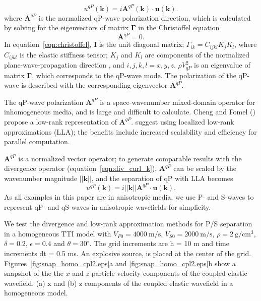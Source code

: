 \documentclass[manuscript,ulem,graphix,revised]{geophysics}
\begin{document}
\begin{equation}
u^{qP}(\boldsymbol{k})=i \boldsymbol{A}^{qP}(\boldsymbol{k}) \cdot \boldsymbol{u}(\boldsymbol{k}).
\label{eqn:div_curl_ak}
\end{equation}
where $\boldsymbol{A}^{qP}$ is the normalized qP-wave polarization direction, which is calculated by solving for the eigenvectors of matrix $\boldsymbol{\Gamma}$ in the Christoffel equation
\begin{equation}
[\boldsymbol{\Gamma}-\rho V_{qP}^2\boldsymbol{I}]\boldsymbol{A}^{qP}=0.
\label{eqn:christoffel}
\end{equation}
In equation~\ref{eqn:christoffel}, $\boldsymbol{I}$ is the unit diagonal matrix; $\Gamma_{ik}=C_{ijkl}K_jK_l$, where $C_{ijkl}$ is the elastic stiffness tensor; $K_j$ and $K_l$ are components of the normalized plane-wave-propagation direction \citep{zhang10}, and $i,j,k,l = x,y,z$. $\rho V_{qP}^2$ is an eigenvalue of matrix $\boldsymbol{\Gamma}$, which corresponds to the qP-wave mode. The polarization of the qP-wave is described with the corresponding eigenvector $\boldsymbol{A}^{qP}$. 

The qP-wave polarization $\boldsymbol{A}^{qP}$ is a space-wavenumber mixed-domain operator for inhomogeneous media, and is large and difficult to calculate. Cheng and Fomel (\citeyear{cheng14}) propose a low-rank representation of $\boldsymbol{A}^{qP}$.
\citet{wenlong17} suggest using localized low-rank approximations (LLA); the benefits include increased scalability and efficiency for parallel computation.  

$\boldsymbol{A}^{qP}$ is a normalized vector operator; to generate comparable results with the divergence operator (equation~\ref{eqn:div_curl_k}), $\boldsymbol{A}^{qP}$ can be scaled by the wavenumber magnitude $||\boldsymbol{k}||$, and the separation of qP with LLA becomes 
\begin{equation}
u^{qP}(\boldsymbol{k})=i||\boldsymbol{k}||\boldsymbol{A}^{qP} \cdot \boldsymbol{u}(\boldsymbol{k}).
\label{eqn:div_curl_ak1}
\end{equation}
As all examples in this paper are in anisotropic media, we use P- and S-waves to represent qP- and qS-waves in anisotropic wavefields for simplicity.

We test the divergence and low-rank approximation methods for P/S separation in a homogeneous TTI model with $V_{P0}=4000~\mathrm{m/s}$, $V_{S0}=2000~\mathrm{m/s}$, $\rho=2~\mathrm{g/cm^3}$, $\delta=0.2$, $\epsilon=0.4$ and $\theta=30^\circ$. 
The grid increments are h = 10 m and time increments dt = 0.5 ms. 
An explosive source, is placed at the center of the grid. 
Figures~\ref{fig:snap_homo_cpl2.eps}a and \ref{fig:snap_homo_cpl2.eps}b show a snapshot of the the $x$ and $z$ particle velocity components of the coupled elastic wavefield.
{
(a) x and (b) z components of the coupled elastic wavefield in a homogeneous model.
}
\end{document}
